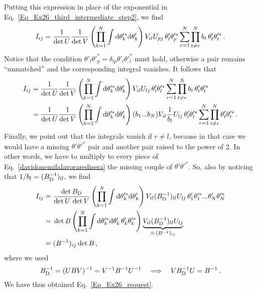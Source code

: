 \begin{sol}
\begin{equation}
    \end{equation}
    Putting this expression in place of the exponential in Eq.~\eqref{Eq_Ex26_third_intermediate_step2}, we find
    \begin{equation}
        I_{ij}
        = \frac{1}{\det U}\frac{1}{\det V} \left(\prod_{k=1}^{N} \int {\rm d} \theta_k'^{*} {\rm d}\theta'_k \right) V_{il} U_{pj} \, \theta'_{l} \theta'^{*}_{p} \sum_{r=1}^{N} \prod_{t \not= r}^{N} b_{t} \,  \theta'_{t} \theta'^{*}_{t} \, . 
    \end{equation}
    Notice that the condition $\theta'_{l} \theta'^{*}_{p} = \delta_{lp} \theta'_{l} \theta'^{*}_{l}$ must hold, otherwise a pair remains ``unmatched'' and the corresponding integral vanishes. It follows that
    \begin{align}
        I_{ij}
        = &\; \frac{1}{\det U}\frac{1}{\det V} \left(\prod_{k=1}^{N} \int {\rm d} \theta_k'^{*} {\rm d}\theta'_k \right) V_{il} U_{lj} \, \theta'_{l} \theta'^{*}_{l} \sum_{r=1}^{N} \prod_{t \not= r}^{N} b_{t} \,  \theta'_{t} \theta'^{*}_{t} \notag\\
        = &\; \frac{1}{\det U}\frac{1}{\det V} \left(\prod_{k=1}^{N} \int {\rm d} \theta_k'^{*} {\rm d}\theta'_k \right) (b_1 ... b_N) V_{il} \frac{1}{b_l} U_{lj} \, \theta'_{l} \theta'^{*}_{l} \sum_{r=1}^{N} \prod_{t \not= r}^{N}  \theta'_{t} \theta'^{*}_{t} \, .
    \end{align}
    Finally, we point out that the integrals vanish if $r\not= l$, because in that case we would have a missing $\theta' \theta'^{*}$ pair and another pair raised to the power of 2.
    In other words, we have to multiply to every piece of Eq.~\eqref{davidonemifalavoraredisera} the missing couple of $\theta' \theta'^{*}$.
    So, also by noticing that $1/b_l = (B_{\rm D}^{-1})_{ll}$, we find
    \begin{align}
        I_{ij}
        = &\; \frac{\det B_{\rm D}}{\det U \, \det V} \left(\prod_{k=1}^{N} \int \rmd \theta_k'^{*} \rmd\theta'_k  \right) V_{il} (B_{\rm D}^{-1})_{ll} U_{lj} \, \theta'_{1} \theta'^{*}_{1}...\theta'_{N} \theta'^{*}_{N} \notag\allowdisplaybreaks \\
        = &\; \det B \left(\prod_{k=1}^{N} \int \rmd \theta_k'^{*} \rmd\theta'_k  \, \theta'_{k} \theta'^{*}_{k} \right) \underbrace{V_{il} (B_{\rm D}^{-1})_{ll} U_{lj}}_{\equiv \, (B^{-1})_{ij}} \notag\allowdisplaybreaks \\
        = &\; (B^{-1})_{ij} \det B \, ,
    \end{align}
    where we used
    \begin{equation}
        B_{\rm D}^{-1} = (U B V)^{-1} = V^{-1} B^{-1} U^{-1} 
        \quad \Longrightarrow \quad
        V B_{\rm D}^{-1} U = B^{-1} \, .
    \end{equation}
    We have thus obtained Eq.~\eqref{Eq_Ex26_request}.
\end{sol}